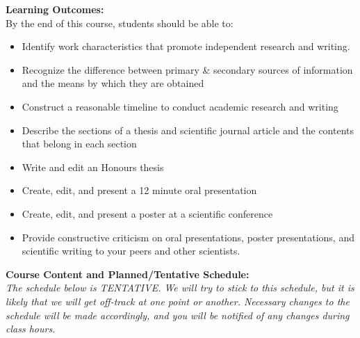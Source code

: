 \documentclass[hidelinks]{article}
\begin{document}
	\newpage
	\textbf{Learning Outcomes:}\\
	By the end of this course, students should be able to:
		\begin{itemize}[topsep=-8pt]
			\item Identify work characteristics that promote independent research and writing.
			\item Recognize the difference between primary \& secondary sources of information and the means by which
they are obtained
			\item Construct a reasonable timeline to conduct academic research and writing
			\item Describe the sections of a thesis and scientific journal article and the contents that belong in each
section
			\item Write and edit an Honours thesis
			\item Create, edit, and present a 12 minute oral presentation
			\item Create, edit, and present a poster at a scientific conference
			\item Provide constructive criticism on oral presentations, poster presentations, and scientific writing to your
peers and other scientists.\\
		\end{itemize}
		
\textbf{Course Content and Planned/Tentative Schedule:}\\
\emph{The schedule below is TENTATIVE. We will try to stick to this schedule, but it is likely that we will get off-track at one point or another. Necessary changes to the schedule will be made accordingly, and you will be notified of any changes during class hours.}	
\end{document}
